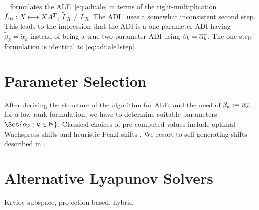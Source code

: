 \begin{remark}
  \citeauthor{Lang2017}~\cite{Lang2017} formulates the \ac{ALE}~\eqref{eq:adi:ale} in terms of the
  right-multiplication $\tilde L_R :X \longmapsto XA^T$, $\tilde L_R \neq L_R$.
  The ADI~\cite[Equation~(2.23)]{Lang2017} uses a somewhat inconsistent second step.
  This leads to the impression that the ADI is a one-parameter ADI having $\tilde\beta_k = \tilde\alpha_k$
  instead of being a true two-parameter ADI using $\beta_k = \conj{\alpha_k}$.
  The one-step formulation \cite[Equation~(2.24)]{Lang2017} is identical to \eqref{eq:adi:ale1step}.
\end{remark}


\section{Parameter Selection}
\label{sec:adi:parameters}

After deriving the structure of the algorithm for \ac{ALE},
and the need of $\beta_k := \conj{\alpha_k}$ for a low-rank formulation,
we have to determine suitable parameters $\Set{\alpha_k : k\in\N}$.
Classical choices of pre-computed values include
optimal Wachspress shifts \cite{Wachspress1992,Wachspress2013} and
heuristic Penzl shifts \cite{Penzl1999}.
We resort to self-generating shifts described in \cite[Section~5.3]{Kuerschner2016}.

\section{Alternative Lyapunov Solvers}
Krylov subspace,
projection-based,
hybrid
